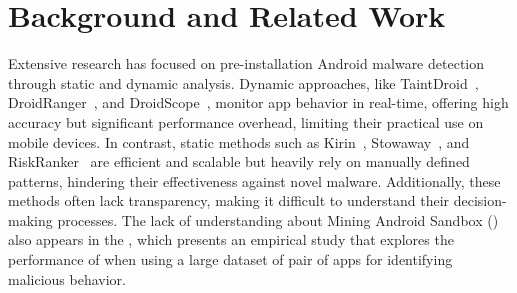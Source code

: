 \section{Background and Related Work}\label{sec:background}

Extensive research has focused on pre-installation Android malware detection through static and dynamic analysis. Dynamic approaches, like TaintDroid~\cite{DBLP:conf/osdi/EnckGCCJMS10}, DroidRanger~\cite{Zhou2012HeyYG}, and DroidScope~\cite{LKYanDroidscope}, monitor app behavior in real-time, offering high accuracy but significant performance overhead, limiting their practical use on mobile devices. In contrast, static methods such as Kirin~\cite{Enck2009}, Stowaway~\cite{DBLP:conf/ccs/FeltCHSW11}, and RiskRanker~\cite{GraceRiskranker2012} are efficient and scalable but heavily rely on manually defined patterns, hindering their effectiveness against novel malware. Additionally, these methods often lack transparency, making it difficult to understand their decision-making processes. The lack of understanding about Mining Android Sandbox (\mas) also appears in the \fhc, which presents an empirical study that explores the performance of \mas when using a large dataset of pair of apps for identifying malicious behavior.




